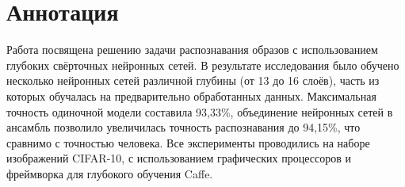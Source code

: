 \section*{Аннотация}
Работа посвящена решению задачи распознавания образов с использованием глубоких свёрточных 
нейронных сетей. В результате исследования было обучено несколько нейронных сетей различной глубины 
(от 13 до 16 слоёв), часть из которых обучалась на предварительно обработанных данных. Максимальная 
точность одиночной модели составила 93,33\%, объединение нейронных сетей в ансамбль позволило
увеличилась точность распознавания до 94,15\%, что сравнимо с точностью человека. Все эксперименты 
проводились на наборе изображений CIFAR-10, с использованием графических процессоров и фреймворка
для глубокого обучения Caffe.